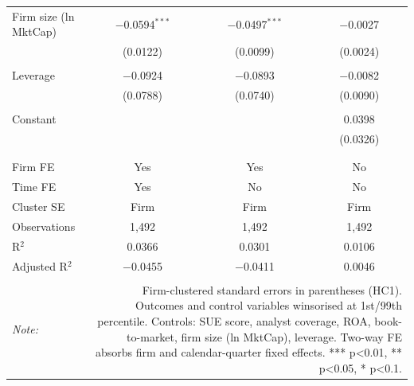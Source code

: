 \begin{table}[!htbp]
\begin{tabular}{@{\extracolsep{5pt}}lccc}
 Firm size (ln MktCap) & $-$0.0594$^{***}$ & $-$0.0497$^{***}$ & $-$0.0027 \\ 
  & (0.0122) & (0.0099) & (0.0024) \\ 
  & & & \\ 
 Leverage & $-$0.0924 & $-$0.0893 & $-$0.0082 \\ 
  & (0.0788) & (0.0740) & (0.0090) \\ 
  & & & \\ 
 Constant &  &  & 0.0398 \\ 
  &  &  & (0.0326) \\ 
  & & & \\ 
\hline \\[-1.8ex] 
Firm FE & Yes & Yes & No \\ 
Time FE & Yes & No & No \\ 
Cluster SE & Firm & Firm & Firm \\ 
Observations & 1,492 & 1,492 & 1,492 \\ 
R$^{2}$ & 0.0366 & 0.0301 & 0.0106 \\ 
Adjusted R$^{2}$ & $-$0.0455 & $-$0.0411 & 0.0046 \\ 
\hline 
\hline \\[-1.8ex] 
\textit{Note:}  & \multicolumn{3}{r}{Firm-clustered standard errors in parentheses (HC1). Outcomes and control variables winsorised at 1st/99th percentile. Controls: SUE score, analyst coverage, ROA, book-to-market, firm size (ln MktCap), leverage. Two-way FE absorbs firm and calendar-quarter fixed effects. *** p<0.01, ** p<0.05, * p<0.1.} \\ 
\end{tabular} 
\end{table} 
